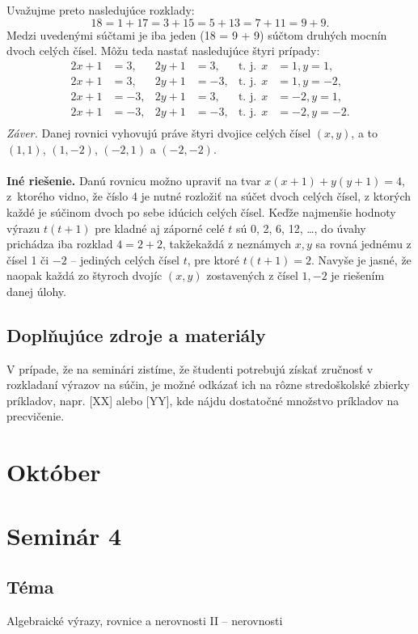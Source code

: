 \documentclass[11pt,a4paper,oneside,final]{book}
\begin{document}
Uvažujme preto nasledujúce rozklady:
$$18 = 1 + 17 = 3 + 15 = 5 + 13 = 7 + 11 = 9 + 9.$$
Medzi uvedenými súčtami je iba jeden (18 = 9 + 9) súčtom druhých mocnín dvoch celých čísel. Môžu teda nastať nasledujúce štyri prípady:
\begin{align*}
2x + 1 &= 3, &  2y + 1 &= 3, & \text{t. j.}\ \  x &= 1, y = 1,\\
2x + 1 &= 3, & 2y + 1 &= -3, & \text{t. j.} \ \ x &= 1, y = -2,\\
2x + 1 &= -3, & 2y + 1 &= 3, & \text{t. j.} \ \ x &= -2, y = 1,\\
2x + 1 &= -3, & 2y + 1 &=-3, & \text{t. j.} \ \  x &= -2, y = -2.\\\
\end{align*}
\textit{Záver.} Danej rovnici vyhovujú práve štyri dvojice celých čísel $(x, y)$, a to $(1, 1)$, $(1, -2)$, $(-2, 1)$ a $(-2, -2)$.\\
\\
\textbf{Iné riešenie.} Danú rovnicu možno upraviť na tvar $x(x + 1) + y(y + 1) = 4$, z~ktorého vidno, že číslo 4 je nutné rozložiť na súčet dvoch celých čísel, z ktorých každé je súčinom dvoch po sebe idúcich celých čísel. Keďže najmenšie hodnoty výrazu $t(t+ 1)$ pre kladné aj záporné celé $t$ sú 0, 2, 6, 12, \ldots , do úvahy prichádza iba rozklad $4 = 2 + 2$, takžekaždá z neznámych $x, y$ sa rovná jednému z čísel 1 či $-2$ -- jediných celých čísel $t$, pre ktoré $t(t+ 1) = 2$. Navyše je jasné, že naopak každá zo štyroch dvojíc $(x, y)$ zostavených z čísel $1, -2$ je riešením danej úlohy.

\subsection*{Doplňujúce zdroje a materiály}
V prípade, že na seminári zistíme, že študenti potrebujú získať zručnosť v rozkladaní výrazov na súčin, je možné odkázať ich na rôzne stredoškolské zbierky príkladov, napr. [XX] alebo [YY], kde nájdu dostatočné množstvo príkladov na precvičenie.

\newpage

\section{Október}

\section*{Seminár 4}
\subsection*{Téma}
Algebraické výrazy, rovnice a nerovnosti II -- nerovnosti
\end{document}
